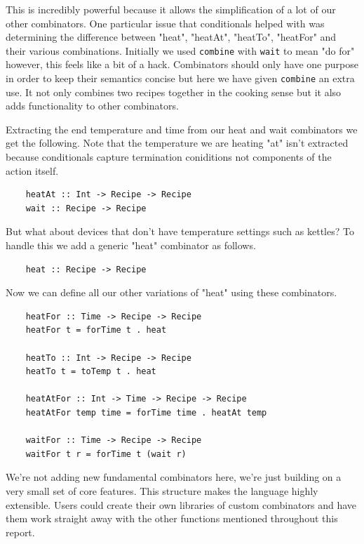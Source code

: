 \documentclass[11pt]{article}
\begin{document}
This is incredibly powerful because it allows the simplification of a lot of our other
combinators. One particular issue that conditionals helped with was determining the
difference between "heat", "heatAt", "heatTo", "heatFor" and their various combinations.
Initially we used \texttt{combine} with \texttt{wait} to mean "do for" however, this
feels like a bit of a hack. Combinators should only have one purpose in order to keep
their semantics concise but here we have given \texttt{combine} an extra use. It not
only combines two recipes together in the cooking sense but it also adds functionality
to other combinators.

\medbreak

Extracting the end temperature and time from our heat and wait combinators we get the
following. Note that the temperature we are heating "at" isn't extracted because
conditionals capture termination coniditions not components of the action itself.

\begin{lstlisting}
    heatAt :: Int -> Recipe -> Recipe
    wait :: Recipe -> Recipe
\end{lstlisting}

But what about devices that don't have temperature settings such as kettles? To handle
this we add a generic "heat" combinator as follows.

\begin{lstlisting}
    heat :: Recipe -> Recipe
\end{lstlisting}

Now we can define all our other variations of "heat" using these combinators.

\begin{lstlisting}
    heatFor :: Time -> Recipe -> Recipe
    heatFor t = forTime t . heat

    heatTo :: Int -> Recipe -> Recipe
    heatTo t = toTemp t . heat

    heatAtFor :: Int -> Time -> Recipe -> Recipe
    heatAtFor temp time = forTime time . heatAt temp

    waitFor :: Time -> Recipe -> Recipe
    waitFor t r = forTime t (wait r)
\end{lstlisting}

We're not adding new fundamental combinators here, we're just building on a very small
set of core features. This structure makes the language highly extensible. Users could
create their own libraries of custom combinators and have them work straight away with
the other functions mentioned throughout this report.
\end{document}
